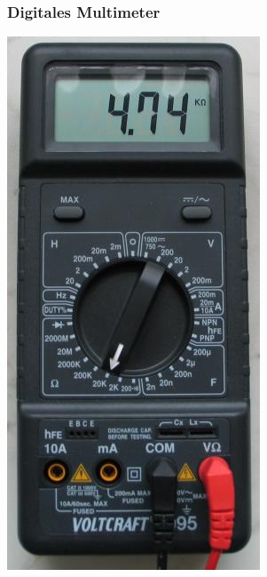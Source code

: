 \begin{frame}
    \frametitle{Digitales Multimeter}
    \begin{center}
        \includegraphics[width=.25\textwidth]{e02/digitalmultimeter.jpg}
    \end{center}
\end{frame}

